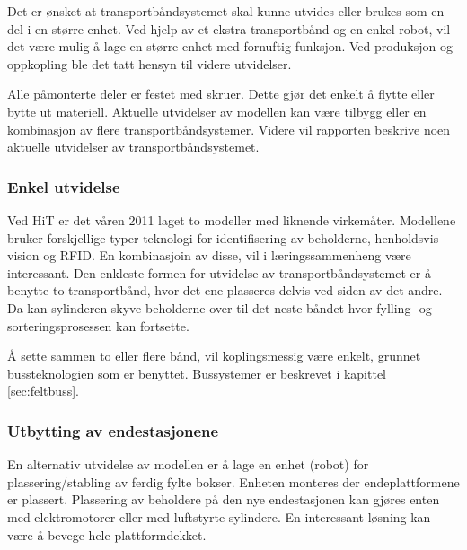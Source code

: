 \documentclass[Visionprosjekt.tex]{subfiles}
\begin{document}
Det er ønsket at transportbåndsystemet skal kunne utvides eller brukes som en del i en større enhet. Ved hjelp av et ekstra transportbånd og en enkel robot, vil det være mulig å lage en større enhet med fornuftig funksjon. Ved produksjon og oppkopling ble det  tatt  hensyn til videre utvidelser.

Alle påmonterte deler er festet med skruer. Dette gjør det enkelt å flytte eller bytte ut materiell. Aktuelle utvidelser av modellen kan være tilbygg eller en kombinasjon av flere transportbåndsystemer. %
Videre vil rapporten beskrive noen aktuelle utvidelser av transportbåndsystemet.





\subsubsection{Enkel utvidelse}

Ved HiT er det våren 2011 laget to modeller med liknende virkemåter. Modellene bruker forskjellige typer teknologi for identifisering av beholderne, henholdsvis vision og RFID. En kombinasjoin av disse, vil i  læringssammenheng være interessant. Den enkleste formen for utvidelse av transportbåndsystemet er å benytte to transportbånd, hvor det ene plasseres delvis ved siden av det andre. Da kan  sylinderen skyve beholderne over til det neste båndet hvor fylling- og sorteringsprosessen kan fortsette. 

Å sette sammen to eller flere bånd, vil koplingsmessig være  enkelt, grunnet bussteknologien som er benyttet. Bussystemer er beskrevet i kapittel \ref{sec:feltbuss}. %



\subsubsection{Utbytting av endestasjonene}

En alternativ utvidelse av modellen er å lage en enhet (robot) for plassering/stabling av ferdig fylte bokser. Enheten monteres der endeplattformene  er plassert. %
Plassering av beholdere på den nye endestasjonen kan gjøres enten med elektromotorer eller med luftstyrte sylindere. En interessant løsning kan være å bevege hele plattformdekket. 
\end{document}
